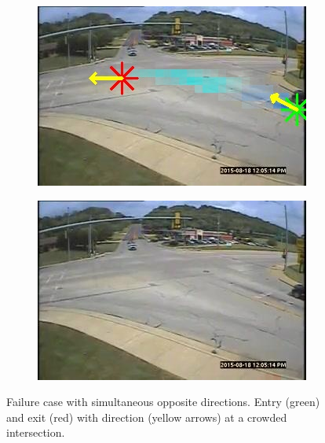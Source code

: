 \begin{figure}
        \begin{subfigure}{0.32\linewidth}
            \includegraphics[width=\linewidth]{./img/scene_learning/res/251950/251950-2.jpg}
        \end{subfigure}
        \begin{subfigure}{0.32\linewidth}
            \includegraphics[width=\linewidth]{./img/scene_learning/res/251950/251950-3.jpg}
        \end{subfigure}
        \caption{Failure case with simultaneous opposite directions. Entry (green) and exit (red) with direction (yellow arrows) at a crowded intersection.}
        \label{fig:entry-exit-fail-2}
\end{figure}